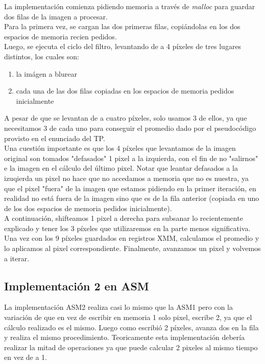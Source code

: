 La implementación comienza pidiendo memoria a través de \textit{malloc} para guardar dos filas de la imagen a procesar.\\Para la primera vez, se cargan las dos primeras filas, copiándolas en los dos espacios de memoria recien pedidos.\\
Luego, se ejecuta el ciclo del filtro, levantando de a 4 píxeles de tres lugares distintos, los cuales son:
\begin{enumerate}
\item la imágen a blurear
\item cada una de las dos filas copiadas en los espacios de memoria pedidos inicialmente
\end{enumerate}
A pesar de que se levantan de a cuatro píxeles, solo usamos 3 de ellos, ya que necesitamos 3 de cada uno para conseguir el promedio dado por el pseudocódigo provisto en el enunciado del TP.\\
Una cuestión importante es que los 4 píxeles que levantamos de la imagen original son tomados "defasados" 1 pixel a la izquierda, con el fin de no "salirnos" e la imagen en el cálculo del último pixel. Notar que leantar defasados a la izuqierda un pixel no hace que no accedamos a memoria que no es nuestra, ya que el pixel "fuera" de la imagen que estamos pidiendo en la primer iteración, en realidad no está fuera de la imagen sino que es de la fila anterior (copiada en uno de los dos espacios de memoria pedidos inicialmente).\\
A continuación, shifteamos 1 pixel a derecha para subsanar lo recientemente explicado y tener los 3 píxeles que utilizaremos en la parte menos significativa.\\
Una vez con los 9 píxeles guardados en registros XMM, calculamos el promedio y lo aplicamos al pixel correspondiente. 
Finalmente, avanzamos un pixel y volvemos a iterar.\\

\subsection{Implementación 2 en ASM}
La implementación ASM2 realiza casi lo mismo que la ASM1 pero con la variación de que en vez de escribir en memoria 1 solo pixel, escribe 2, ya que el cálculo realizado es el mismo. Luego como escribió 2 píxeles, avanza dos en la fila y realiza el mismo procedimiento. Teoricamente esta implementación debería realizar la mitad de operaciones ya que puede calcular 2 pixeles al mismo tiempo en vez de a 1.


